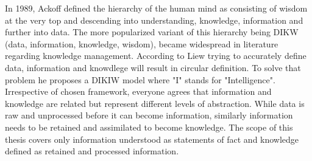 \label{chapter:related}

In 1989, Ackoff\cite{ackoff1989data} defined the hierarchy of the human mind as consisting of wisdom at the very top and descending into understanding, knowledge, information and further into data.
The more popularized variant of this hierarchy being DIKW (data, information, knowledge, wisdom), became widespread in literature regarding knowledge management\cite{skyrme2007knowledge}.
According to Liew\cite{liew2013dikiw} trying to accurately define data, information and knowdlege will result in circular definition.
To solve that problem he proposes a DIKIW model where "I" stands for "Intelligence".
Irrespective of chosen framework, everyone agrees that information and knowledge are related but represent different levels of abstraction.
While data is raw and unprocessed before it can become information, similarly information needs to be retained and assimilated to become knowledge.
The scope of this thesis covers only information understood as statements of fact and knowledge defined as retained and processed information.


